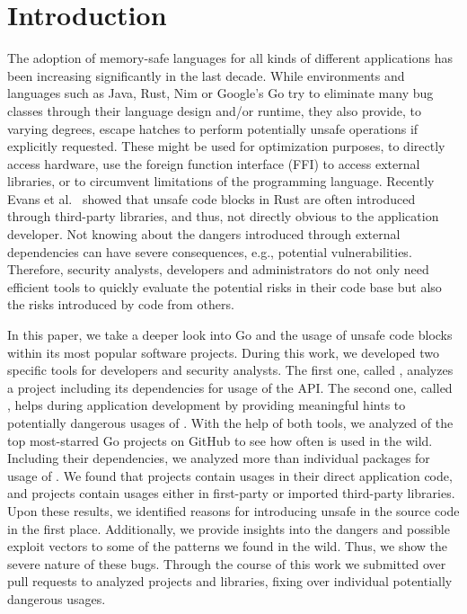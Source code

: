 \section{Introduction}
\label{sec:intro}

The adoption of memory-safe languages for all kinds of different applications has been increasing significantly in the last decade. 
While environments and languages such as Java, Rust, Nim or Google's Go try to eliminate many bug classes through their language design and/or runtime, they also provide, to varying degrees, escape hatches to perform potentially unsafe operations if explicitly requested.
These might be used for optimization purposes, to directly access hardware, use the foreign function interface (FFI) to access external libraries, or to circumvent limitations of the programming language.
Recently Evans et al.~\cite{evans2020} showed that unsafe code blocks in Rust are often introduced through third-party libraries, and thus, not directly obvious to the application developer. 
Not knowing about the dangers introduced through external dependencies can have severe consequences, e.g., potential vulnerabilities.
Therefore, security analysts, developers and administrators do not only need efficient tools to quickly evaluate the potential risks in their code base but also the risks introduced by code from others.

In this paper, we take a deeper look into Go and the usage of unsafe code blocks within its most popular software projects. 
During this work, we developed two specific tools for developers and security analysts.
The first one, called \toolUsage{}, analyzes a project including its dependencies for usage of the \unsafe{} API. %
The second one, called \toolSA{}, helps during application development by providing meaningful hints to potentially dangerous usages of \unsafe{}.
With the help of both tools, we analyzed \projsAnalyzed{} of the top \initalProjs{} most-starred Go projects on GitHub to see how often \unsafe{} is used in the wild. 
Including their dependencies, we analyzed more than \packagesAnalyzedRounded{} individual packages for usage of \unsafe{}.
We found that \percentageProjectsWithUnsafe{} projects contain \unsafe{} usages in their direct application code, and \percentageProjectsAndDependenciesUnsafe{}
projects contain \unsafe{} usages either in first-party or imported third-party libraries.
Upon these results, we identified reasons for introducing unsafe in the source code in the first place. 
Additionally, we provide insights into the dangers and possible exploit vectors to some of the patterns we found in the wild. 
Thus, we show the severe nature of these bugs.
Through the course of this work we submitted over \numberPRs{} pull requests to analyzed projects and libraries, fixing over \numberBugsFixed{} individual potentially dangerous \unsafe{} usages.

